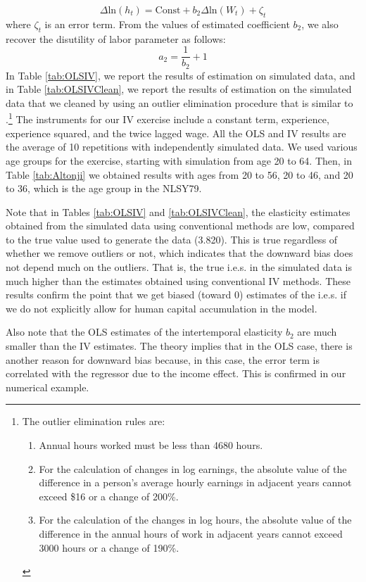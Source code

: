 \documentclass[\econtexRoot/ImaiKeane]{subfiles}
\begin{document}
$$ \Delta \text{ln}(h_t) = \text{Const} + b_2 \Delta \text{ln}(W_t) + \zeta_t$$
where $\zeta_t$ is an error term. From the values of estimated coefficient $b_2$, we also recover the disutility of labor parameter as follows:
$$ a_2 = \dfrac{1}{b_2} + 1 $$
In Table \ref{tab:OLSIV}, we report the results of estimation on simulated data, and in Table \ref{tab:OLSIVClean}, we report the results of estimation on the simulated data that we cleaned by using an outlier elimination procedure that is similar to \cite{MaCurdy1981-iy}.\footnote[12]{The outlier elimination rules are:
  \begin{enumerate}
      \item Annual hours worked must be less than 4680 hours.
      \item For the calculation of changes in log earnings, the absolute value of the difference in a person's average hourly earnings in adjacent years cannot exceed \$16 or a change of 200\%.
        \item For the calculation of the changes in log hours, the absolute value of the difference in the annual hours of work in adjacent years cannot exceed 3000 hours or a change of 190\%.
        \end{enumerate}} The instruments for our IV exercise include a constant term, experience, experience squared, and the twice lagged wage. All the OLS and IV results are the average of 10 repetitions with independently simulated data. We used various age groups for the exercise, starting with simulation from age 20 to 64. Then, in Table \ref{tab:Altonji} we obtained results with ages from 20 to 56, 20 to 46, and 20 to 36, which is the age group in the NLSY79. \par
      
      
      Note that in Tables \ref{tab:OLSIV} and \ref{tab:OLSIVClean}, the elasticity estimates obtained from the simulated data using conventional methods are low, compared to the true value used to generate the data (3.820). This is true regardless of whether we remove outliers or not, which indicates that the downward bias does not depend much on the outliers. That is, the true i.e.s. in the simulated data is much higher than the estimates obtained using conventional IV methods. These results confirm the point that we get biased (toward 0) estimates of the i.e.s. if we do not explicitly allow for human capital accumulation in the model. \par
      
      Also note that the OLS estimates of the intertemporal elasticity $b_2$ are much smaller than the IV estimates. The theory implies that in the OLS case, there is another reason for downward bias because, in this case, the error term is correlated with the regressor due to the income effect. This is confirmed in our numerical example. \par
\end{document}

